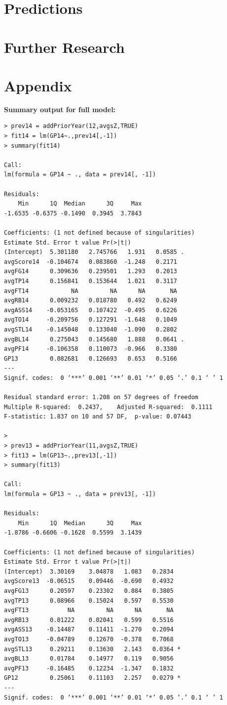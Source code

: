 \documentclass[]{scrartcl}
\begin{document}
\section*{Predictions}
\section*{Further Research}
\section*{Appendix}
{\textbf{Summary output for full model:}}
\begin{verbatim}
> prev14 = addPriorYear(12,avgsZ,TRUE)
> fit14 = lm(GP14~.,prev14[,-1])
> summary(fit14)

Call:
lm(formula = GP14 ~ ., data = prev14[, -1])

Residuals:
    Min      1Q  Median      3Q     Max 
-1.6535 -0.6375 -0.1490  0.3945  3.7843 

Coefficients: (1 not defined because of singularities)
Estimate Std. Error t value Pr(>|t|)  
(Intercept)  5.301180   2.745766   1.931   0.0585 .
avgScore14  -0.104674   0.083860  -1.248   0.2171  
avgFG14      0.309636   0.239501   1.293   0.2013  
avgTP14      0.156841   0.153644   1.021   0.3117  
avgFT14            NA         NA      NA       NA  
avgRB14      0.009232   0.018780   0.492   0.6249  
avgASS14    -0.053165   0.107422  -0.495   0.6226  
avgTO14     -0.209756   0.127291  -1.648   0.1049  
avgSTL14    -0.145048   0.133040  -1.090   0.2802  
avgBL14      0.275043   0.145680   1.888   0.0641 .
avgPF14     -0.106358   0.110073  -0.966   0.3380  
GP13         0.082681   0.126693   0.653   0.5166  
---
Signif. codes:  0 ‘***’ 0.001 ‘**’ 0.01 ‘*’ 0.05 ‘.’ 0.1 ‘ ’ 1

Residual standard error: 1.208 on 57 degrees of freedom
Multiple R-squared:  0.2437,	Adjusted R-squared:  0.1111 
F-statistic: 1.837 on 10 and 57 DF,  p-value: 0.07443

> 
> prev13 = addPriorYear(11,avgsZ,TRUE)
> fit13 = lm(GP13~.,prev13[,-1])
> summary(fit13)

Call:
lm(formula = GP13 ~ ., data = prev13[, -1])

Residuals:
    Min      1Q  Median      3Q     Max 
-1.8786 -0.6606 -0.1628  0.5599  3.1439 

Coefficients: (1 not defined because of singularities)
Estimate Std. Error t value Pr(>|t|)  
(Intercept)  3.30169    3.04878   1.083   0.2834  
avgScore13  -0.06515    0.09446  -0.690   0.4932  
avgFG13      0.20597    0.23302   0.884   0.3805  
avgTP13      0.08966    0.15024   0.597   0.5530  
avgFT13           NA         NA      NA       NA  
avgRB13      0.01222    0.02041   0.599   0.5516  
avgASS13    -0.14487    0.11411  -1.270   0.2094  
avgTO13     -0.04789    0.12670  -0.378   0.7068  
avgSTL13     0.29211    0.13630   2.143   0.0364 *
avgBL13      0.01784    0.14977   0.119   0.9056  
avgPF13     -0.16485    0.12234  -1.347   0.1832  
GP12         0.25061    0.11103   2.257   0.0279 *
---
Signif. codes:  0 ‘***’ 0.001 ‘**’ 0.01 ‘*’ 0.05 ‘.’ 0.1 ‘ ’ 1


\end{verbatim}
\end{document}
